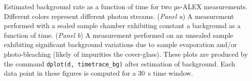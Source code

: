\label{fig:bg_timetrace} Estimated background rate as a function of time for two µs-ALEX measurements. Different colors represent different photon streams. (\textit{Panel a}) A measurement performed with a sealed sample chamber exhibiting constant a background as a function of time. (\textit{Panel b}) A measurement performed on an unsealed sample exhibiting significant background variations due to sample evaporation and/or photo-bleaching (likely of impurities the cover-glass). 
These plots are produced by the command
\texttt{dplot(d, timetrace\_bg)} after estimation of background.
Each data point in these figures is computed for a 30~s time window.

